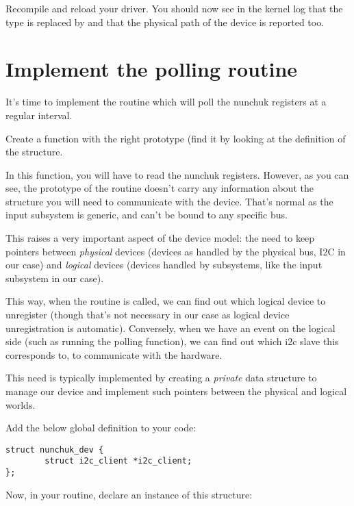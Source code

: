 
Recompile and reload your driver. You should now see in the kernel log
that the  type is replaced by
 and that the physical path of the device is reported
too.

\section{Implement the polling routine}

It's time to implement the routine which will poll the nunchuk registers
at a regular interval.

Create a  function with the right prototype (find
it by looking at the definition of the  structure.

In this function, you will have to read the nunchuk registers. However,
as you can see, the prototype of the  routine doesn't
carry any information about the  structure you will
need to communicate with the device. That's normal as the input
subsystem is generic, and can't be bound to any specific bus.

This raises a very important aspect of the device model: the need to
keep pointers between {\em physical} devices (devices as handled by the
physical bus, I2C in our case) and {\em logical} devices (devices
handled by subsystems, like the input subsystem in our case).

This way, when the  routine is called, we can find out
which logical device to unregister (though that's not necessary in our
case as logical device unregistration is automatic). Conversely, when we
have an event on the logical side (such as running the polling
function), we can find out which i2c slave this corresponds to,
to communicate with the hardware.

This need is typically implemented by creating a {\em private} data
structure to manage our device and implement such pointers between
the physical and logical worlds.

Add the below global definition to your code:

\begin{verbatim}
struct nunchuk_dev {
        struct i2c_client *i2c_client;
};
\end{verbatim}

Now, in your  routine, declare an instance of
this structure:

